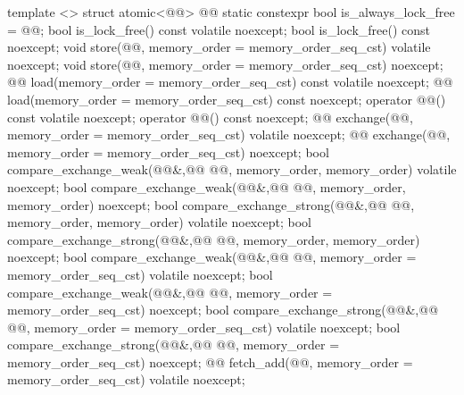 \begin{codeblock}
  template <> struct atomic<@@> {
    @@
    static constexpr bool is_always_lock_free = @@;
    bool is_lock_free() const volatile noexcept;
    bool is_lock_free() const noexcept;
    void store(@@, memory_order = memory_order_seq_cst) volatile noexcept;
    void store(@@, memory_order = memory_order_seq_cst) noexcept;
    @@ load(memory_order = memory_order_seq_cst) const volatile noexcept;
    @@ load(memory_order = memory_order_seq_cst) const noexcept;
    operator @@() const volatile noexcept;
    operator @@() const noexcept;
    @@ exchange(@@, memory_order = memory_order_seq_cst) volatile noexcept;
    @@ exchange(@@, memory_order = memory_order_seq_cst) noexcept;
    bool compare_exchange_weak(@@&,@\itcorr[-1]@ @@,
                               memory_order, memory_order) volatile noexcept;
    bool compare_exchange_weak(@@&,@\itcorr[-1]@ @@,
                               memory_order, memory_order) noexcept;
    bool compare_exchange_strong(@@&,@\itcorr[-1]@ @@,
                                 memory_order, memory_order) volatile noexcept;
    bool compare_exchange_strong(@@&,@\itcorr[-1]@ @@,
                                 memory_order, memory_order) noexcept;
    bool compare_exchange_weak(@@&,@\itcorr[-1]@ @@,
                               memory_order = memory_order_seq_cst) volatile noexcept;
    bool compare_exchange_weak(@@&,@\itcorr[-1]@ @@,
                               memory_order = memory_order_seq_cst) noexcept;
    bool compare_exchange_strong(@@&,@\itcorr[-1]@ @@,
                               memory_order = memory_order_seq_cst) volatile noexcept;
    bool compare_exchange_strong(@@&,@\itcorr[-1]@ @@,
                               memory_order = memory_order_seq_cst) noexcept;
    @@ fetch_add(@@, memory_order = memory_order_seq_cst) volatile noexcept;
}
\end{codeblock}
